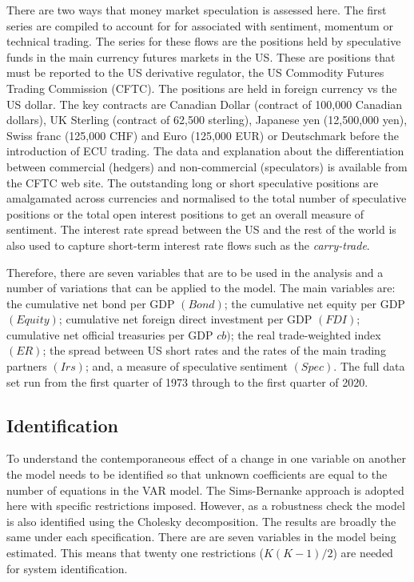 \documentclass[jrfm,communication,submit,moreauthors,pdftex]{Definitions/mdpi}
\begin{document}
There are two ways that money market speculation is assessed here.  The first series are compiled to account for for associated with sentiment, momentum or technical trading.  The series for these flows are the positions held by speculative funds in the main currency futures markets in the US.  These are positions that must be reported to the US derivative regulator, the US Commodity Futures Trading Commission (CFTC).  The positions are held in foreign currency vs the US dollar.  The key contracts are Canadian Dollar (contract of 100,000 Canadian dollars), UK Sterling (contract of 62,500 sterling), Japanese yen (12,500,000 yen), Swiss franc (125,000 CHF) and Euro (125,000 EUR) or Deutschmark before the introduction of ECU trading.  The data and explanation about the differentiation between commercial (hedgers) and non-commercial (speculators) is available from the CFTC web site.   The outstanding long or short speculative positions are amalgamated across currencies and normalised to the total number of speculative positions or the total open interest positions to get an overall measure of sentiment.  The interest rate spread between the US and the rest of the world is also used to capture short-term interest rate flows such as the \emph{carry-trade}. 

Therefore, there are seven variables that are to be used in the analysis and a number of variations that can be applied to the model.  The main variables are:  the cumulative net bond per GDP $(Bond)$; the cumulative net equity per GDP $(Equity)$; cumulative net foreign direct investment per GDP $(FDI)$; cumulative net official treasuries per GDP $cb)$; the real trade-weighted index $(ER)$;  the spread between US short rates and the rates of the main trading partners $(Irs)$; and, a measure of speculative sentiment $(Spec)$. The full data set run from the first quarter of 1973 through to the first quarter of 2020.   

\subsection{Identification}
To understand the contemporaneous effect of a change in one variable on another the model needs to be identified so that unknown coefficients are equal to the number of equations in the VAR model. The Sims-Bernanke approach is adopted here with specific restrictions imposed.  However, as a robustness check the model is also identified using the Cholesky decomposition. The results are broadly the same under each specification.  There are are seven variables in the model being estimated. This means that  twenty one restrictions ($K(K-1)/2$) are needed for system identification.    
\end{document}

